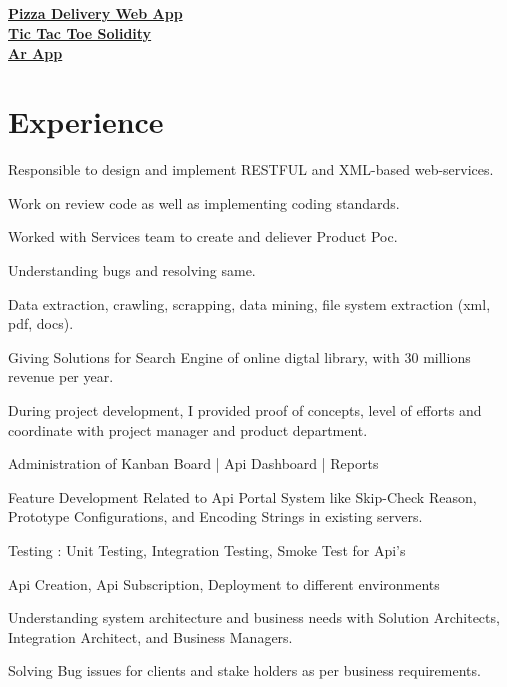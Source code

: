 \documentclass[]{deedy-resume-openfont}
\begin{document}
\begin{minipage}[t]{0.33\textwidth}
\subsection{}
 \href{https://github.com/karshil2309/Pizza_delivery_WebApp}{\bf Pizza Delivery Web App}\\
\href{https://github.com/karshil2309/BlockhainTask_Quillhash}{\bf Tic Tac Toe Solidity}\\ 
\href{https://github.com/karshil2309/ArCoreAdornAr Core Adorn }{\bf Ar App }
\sectionsep


%
%

\end{minipage} 
\hfill
\begin{minipage}[t]{0.66\textwidth} 


\section{Experience}
\vspace{\topsep} %
\begin{tightemize}
\item Responsible to design and implement RESTFUL and XML-based web-services.
\item Work on review code as well as implementing coding standards. 
\item Worked with Services team to create and deliever Product Poc.
\item Understanding bugs and resolving same.
\item Data extraction, crawling, scrapping, data mining, file system extraction (xml, pdf, docs).
\item Giving Solutions for Search Engine of  online digtal library, with 30 millions revenue per year. 
\item During project development, I provided proof of concepts, level of efforts and coordinate with project manager and product department.
\item Administration of Kanban Board | Api Dashboard | Reports
\item Feature Development Related to Api Portal System like Skip-Check Reason, Prototype Configurations, and Encoding Strings in existing servers. 
\item Testing : Unit Testing, Integration Testing, Smoke Test for Api’s
\item Api Creation, Api Subscription, Deployment to different environments
\item Understanding system architecture and business needs with Solution Architects, Integration Architect, and Business Managers.
\item Solving Bug issues for clients and stake holders as per business requirements.
\end{tightemize}
\sectionsep


\end{minipage}
\end{document}
